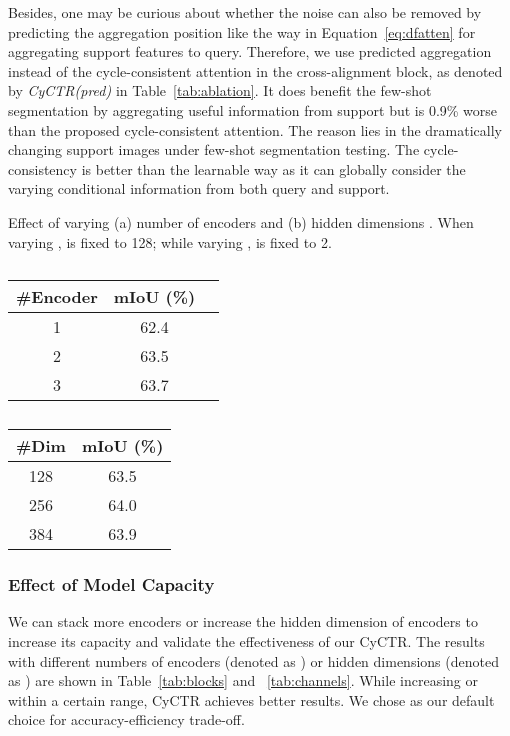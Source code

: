 \documentclass{article}
\begin{document}
Besides, one may be curious about whether the noise can also be removed by predicting the aggregation position like the way in Equation~\ref{eq:dfatten} for aggregating support features to query. Therefore, we use predicted aggregation  instead of the cycle-consistent attention in the cross-alignment block, as denoted by \textit{CyCTR(pred)} in Table~\ref{tab:ablation}. It does benefit the few-shot segmentation by aggregating useful information from support but is 0.9\% worse than the proposed cycle-consistent attention. The reason lies in the dramatically changing support images under few-shot segmentation testing. The cycle-consistency is better than the learnable way as it can globally consider the varying conditional information from both query and support. 

\begin{wraptable}{r}{0.5\textwidth}
\vspace{-4.4mm}
		 \caption{Effect of varying (a) number of encoders  and (b) hidden dimensions .
		  When varying ,  is fixed to 128; while varying ,  is fixed to 2.}
		\begin{subtable}[h]{0.25\textwidth}
		\centering
		\tabcolsep 0.06in\begin{tabular}{ccc}
		\toprule[1pt]
		\#Encoder  & mIoU (\%) \\
		\hline
			1 &  62.4 \\
			2 &  63.5 \\
			3 &  63.7 \\
		\bottomrule[1pt]
		\end{tabular}
		   \caption{}
		   \label{tab:blocks}
		\end{subtable} \hspace{-1.5mm}
		\hfill
		\tabcolsep 0.06in\begin{subtable}[h]{0.25\textwidth}
			\centering
			\begin{tabular}{cc}
				\toprule[1pt]
				\#Dim  & mIoU (\%) \\
				\hline
					128 & 63.5 \\
					256 & 64.0 \\
					384 & 63.9 \\
\bottomrule[1pt]
				\end{tabular}
			\caption{}
			\label{tab:channels}
		 \end{subtable}\vspace{-5mm}
		 \label{tab:temps}
\end{wraptable}

\subsubsection{Effect of Model Capacity}
We can stack more encoders or increase the hidden dimension of encoders to increase its capacity and validate the effectiveness of our CyCTR.
The results with different numbers of encoders (denoted as ) or hidden dimensions (denoted as ) are shown in Table~\ref{tab:blocks} and ~\ref{tab:channels}. 
While increasing  or  within a certain range, CyCTR achieves better results. 
We chose  as our default choice for accuracy-efficiency trade-off. 
\end{document}
